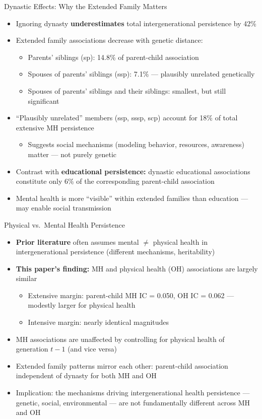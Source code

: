 \documentclass[aspectratio=169]{beamer}
\begin{document}
\begin{frame}{Dynastic Effects: Why the Extended Family Matters}
  \begin{itemize}
    \item Ignoring dynasty \textbf{underestimates} total intergenerational persistence by 42\%
    \item Extended family associations decrease with genetic distance:
    \begin{itemize}
      \item Parents' siblings (sp): 14.8\% of parent-child association
      \item Spouses of parents' siblings (ssp): 7.1\% --- plausibly unrelated genetically
      \item Spouses of parents' siblings and their siblings: smallest, but still significant
    \end{itemize}
    \item ``Plausibly unrelated'' members (ssp, sssp, scp) account for 18\% of total extensive MH persistence
    \begin{itemize}
      \item Suggests social mechanisms (modeling behavior, resources, awareness) matter --- not purely genetic
    \end{itemize}
    \item Contrast with \textbf{educational persistence:} dynastic educational associations constitute only 6\% of the corresponding parent-child association
    \item Mental health is more ``visible'' within extended families than education --- may enable social transmission
  \end{itemize}
\end{frame}

\begin{frame}{Physical vs.\ Mental Health Persistence}
  \begin{itemize}
    \item \textbf{Prior literature} often assumes mental $\neq$ physical health in intergenerational persistence (different mechanisms, heritability)
    \item \textbf{This paper's finding:} MH and physical health (OH) associations are largely similar
    \begin{itemize}
      \item Extensive margin: parent-child MH IC = 0.050, OH IC = 0.062 --- modestly larger for physical health
      \item Intensive margin: nearly identical magnitudes
    \end{itemize}
    \item MH associations are unaffected by controlling for physical health of generation $t-1$ (and vice versa)
    \item Extended family patterns mirror each other: parent-child association independent of dynasty for both MH and OH
    \item Implication: the mechanisms driving intergenerational health persistence --- genetic, social, environmental --- are not fundamentally different across MH and OH
  \end{itemize}
\end{frame}
\end{document}
